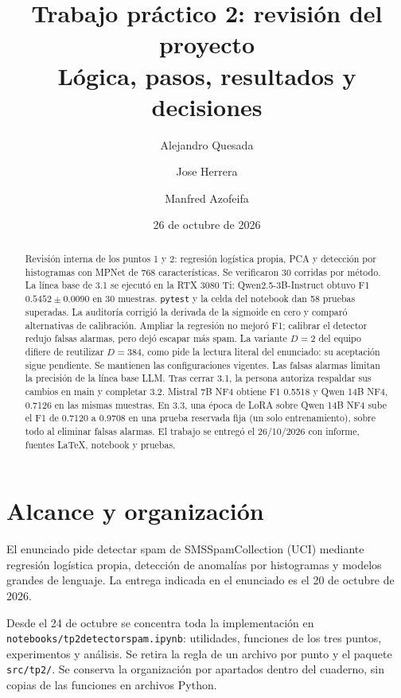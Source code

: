 \documentclass[11pt,letterpaper]{article}
\title{Trabajo práctico 2: revisión del proyecto\\[0.5ex]\large Lógica, pasos, resultados y decisiones}
\author{Alejandro Quesada \and Jose Herrera \and Manfred Azofeifa}
\date{26 de octubre de 2026}
\renewcommand{\_}{\originalunderscore\allowbreak}
\begin{document}
\maketitle
\begin{abstract}
Revisión interna de los puntos 1 y 2: regresión logística propia, PCA y
detección por histogramas con MPNet de 768 características. Se verificaron
30 corridas por método. La línea base de 3.1 se ejecutó en la RTX 3080 Ti:
Qwen2.5-3B-Instruct obtuvo F1 $0.5452\pm0.0090$ en 30 muestras.
\texttt{pytest} y la celda del notebook dan 58 pruebas superadas.
La auditoría corrigió la derivada de la sigmoide en cero y comparó
alternativas de calibración. Ampliar la regresión no mejoró F1; calibrar el
detector redujo falsas alarmas, pero dejó escapar más spam. La variante
$D=2$ del equipo difiere de reutilizar $D=384$, como pide la lectura literal
del enunciado: su aceptación sigue pendiente. Se mantienen las
configuraciones vigentes. Las falsas alarmas limitan la precisión de la
línea base LLM. Tras cerrar 3.1, la persona autoriza respaldar sus cambios
en main y completar 3.2. Mistral 7B NF4 obtiene F1 0.5518 y Qwen 14B
NF4, 0.7126 en las mismas muestras. En 3.3, una época de LoRA sobre Qwen 14B
NF4 sube el F1 de 0.7120 a 0.9708 en una prueba reservada fija (un solo
entrenamiento), sobre todo al eliminar falsas alarmas. El trabajo se
entregó el 26/10/2026 con informe, fuentes LaTeX, notebook y pruebas.
\end{abstract}
{\small\tableofcontents}
\newpage

\section{Alcance y organización}
El enunciado pide detectar spam de SMSSpamCollection (UCI) mediante regresión
logística propia, detección de anomalías por histogramas y modelos grandes de
lenguaje. La entrega indicada en el enunciado es el 20 de octubre de 2026.

Desde el 24 de octubre se concentra toda la implementación en
\texttt{notebooks/tp2\_detector\_spam.ipynb}: utilidades, funciones de los tres
puntos, experimentos y análisis. Se retira la regla de un archivo por punto y
el paquete \texttt{src/tp2/}. Se conserva la organización por apartados dentro
del cuaderno, sin copias de las funciones en archivos Python.
\end{document}
